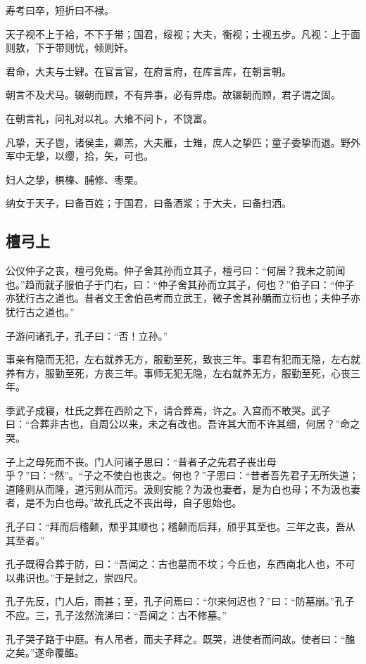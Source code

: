 \documentclass[]{article}
\begin{document}
寿考曰卒，短折曰不禄。

天子视不上于袷，不下于带；国君，绥视；大夫，衡视；士视五步。凡视：上于面则敖，下于带则忧，倾则奸。

君命，大夫与士肄。在官言官，在府言府，在库言库，在朝言朝。

朝言不及犬马。辍朝而顾，不有异事，必有异虑。故辍朝而顾，君子谓之固。

在朝言礼，问礼对以礼。大飨不问卜，不饶富。

凡挚，天子鬯，诸侯圭，卿羔，大夫雁，士雉，庶人之挚匹；童子委挚而退。野外军中无挚，以缨，拾，矢，可也。

妇人之挚，椇榛、脯修、枣栗。

纳女于天子，曰备百姓；于国君，曰备酒浆；于大夫，曰备扫洒。

\hypertarget{header-n127}{%
\subsection{檀弓上}\label{header-n127}}

公仪仲子之丧，檀弓免焉。仲子舍其孙而立其子，檀弓曰：``何居？我未之前闻也。''趋而就子服伯子于门右，曰：``仲子舍其孙而立其子，何也？''伯子曰：``仲子亦犹行古之道也。昔者文王舍伯邑考而立武王，微子舍其孙腯而立衍也；夫仲子亦犹行古之道也。''

子游问诸孔子，孔子曰：``否！立孙。''

事亲有隐而无犯，左右就养无方，服勤至死，致丧三年。事君有犯而无隐，左右就养有方，服勤至死，方丧三年。事师无犯无隐，左右就养无方，服勤至死，心丧三年。

季武子成寝，杜氏之葬在西阶之下，请合葬焉，许之。入宫而不敢哭。武子曰：``合葬非古也，自周公以来，未之有改也。吾许其大而不许其细，何居？''命之哭。

子上之母死而不丧。门人问诸子思曰：``昔者子之先君子丧出母乎？''曰：``然''。``子之不使白也丧之。何也？''子思曰：``昔者吾先君子无所失道；道隆则从而隆，道污则从而污。汲则安能？为汲也妻者，是为白也母；不为汲也妻者，是不为白也母。''故孔氏之不丧出母，自子思始也。

孔子曰：``拜而后稽颡，颓乎其顺也；稽颡而后拜，颀乎其至也。三年之丧，吾从其至者。''

孔子既得合葬于防，曰：``吾闻之：古也墓而不坟；今丘也，东西南北人也，不可以弗识也。''于是封之，崇四尺。

孔子先反，门人后，雨甚；至，孔子问焉曰：``尔来何迟也？''曰：``防墓崩。''孔子不应。三，孔子泫然流涕曰：``吾闻之：古不修墓。''

孔子哭子路于中庭。有人吊者，而夫子拜之。既哭，进使者而问故。使者曰：``醢之矣。''遂命覆醢。
\end{document}
